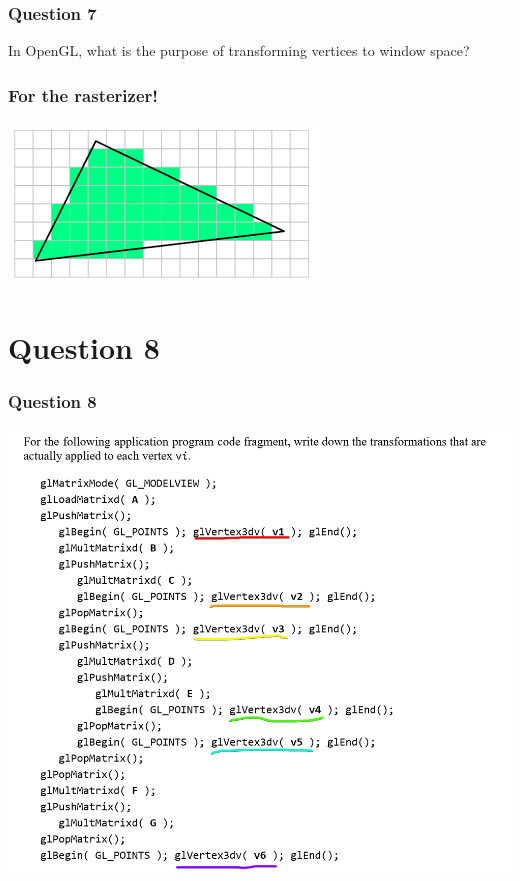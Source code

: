 \documentclass{beamer}
\begin{document}
\begin{frame}
    \frametitle{Question 7}

    In OpenGL, what is the purpose of transforming vertices to window space?

\end{frame}

\begin{frame}
    \frametitle{For the rasterizer!}

    \begin{center}
        \includegraphics[scale=0.6]{rasterizer.png}
    \end{center}

\end{frame}

\section{Question 8}

\begin{frame}
    \frametitle{Question 8}

    \begin{center}
        \includegraphics[scale=0.5]{q8.png}
    \end{center}

\end{frame}
\end{document}
